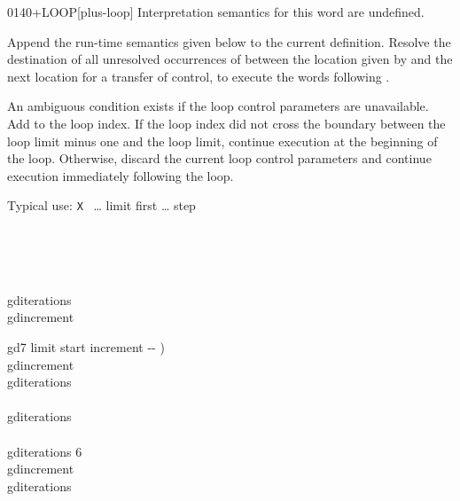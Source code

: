 \begin{worddef}{0140}{+LOOP}[plus-loop]
\interpret
	Interpretation semantics for this word are undefined.

\compile

	Append the run-time semantics given below to the current
	definition. Resolve the destination of all unresolved
	occurrences of  between the location given
	by  and the next location for a transfer of
	control, to execute the words following .

\runtime

	An ambiguous condition exists if the loop control parameters
	are unavailable. Add  to the loop index. If the loop
	index did not cross the boundary between the loop limit minus
	one and the loop limit, continue execution at the beginning
	of the loop. Otherwise, discard the current loop control
	parameters and continue execution immediately following the
	loop.


	\begin{rationale} %
		Typical use:
			\word{:} \texttt{X} ~{\ldots} limit first 
				{\ldots} step 
			\word{;}
	\end{rationale}

	\begin{testing} %
		\ttfamily
		 \\
		 \\
		 \\

		 gditerations \\
		 gdincrement

		\word{:} gd7  limit start increment -{}- ) \\
		\tab gdincrement \word{!} \\
		 gditerations \word{!} \\
		\tab {} \\
		 gditerations \word{+!} \\
		\tab[2]  \\
		\tab[2] gditerations   6 \word{=}    \\
		\tab[2] gdincrement  \\
		\tab {} gditerations  \\
		\word{;}


\end{testing}
\end{worddef}
